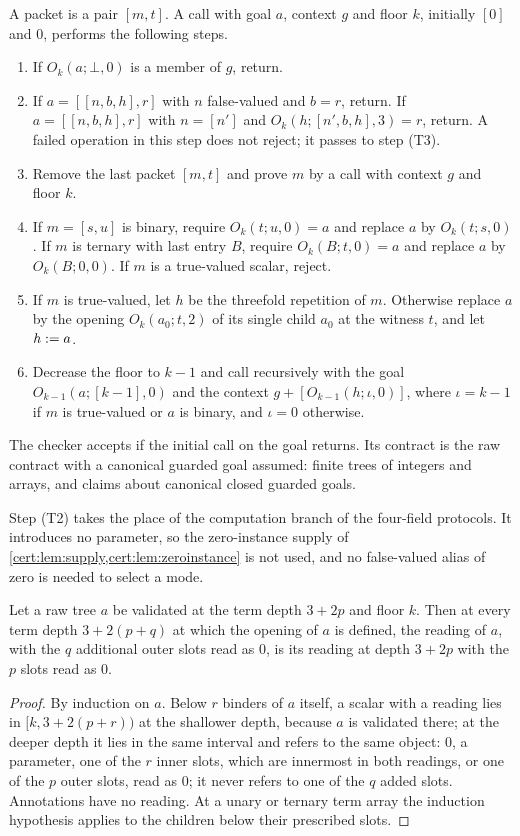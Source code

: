 \begin{definition}\label{cert:def:two-field}
A packet is a pair $[m,t]$. A call with goal $a$, context $g$ and floor $k$,
initially $[0]$ and $0$, performs the following steps.
\begin{enumerate}[label=(T\arabic*)]
\item If $O_k(a;\bot,0)$ is a member of $g$, return.
\item If $a=[[n,b,h],r]$ with $n$ false-valued and $b=r$, return. If
$a=[[n,b,h],r]$ with $n=[n']$ and $O_k(h;[n',b,h],3)=r$, return. A failed
operation in this step does not reject; it passes to step (T3).
\item Remove the last packet $[m,t]$ and prove $m$ by a call with context $g$
and floor $k$.
\item If $m=[s,u]$ is binary, require $O_k(t;u,0)=a$ and replace $a$ by
$O_k(t;s,0)$. If $m$ is ternary with last entry $B$, require $O_k(B;t,0)=a$
and replace $a$ by $O_k(B;0,0)$. If $m$ is a true-valued scalar, reject.
\item If $m$ is true-valued, let $h$ be the threefold repetition of $m$.
Otherwise replace $a$ by the opening $O_k(a_0;t,2)$ of its single child $a_0$
at the witness $t$, and let $h\mathrel{:=} a$.
\item Decrease the floor to $k-1$ and call recursively with the goal
$O_{k-1}(a;[k-1],0)$ and the context $g+[O_{k-1}(h;\iota,0)]$, where
$\iota=k-1$ if $m$ is true-valued or $a$ is binary, and $\iota=0$ otherwise.
\end{enumerate}
The checker accepts if the initial call on the goal returns. Its contract is
the raw contract with a canonical guarded goal assumed: finite trees of
integers and arrays, and claims about canonical closed guarded goals.
\end{definition}

Step (T2) takes the place of the computation branch of the four-field
protocols. It introduces no parameter, so the zero-instance supply of
\cref{cert:lem:supply,cert:lem:zeroinstance} is not used, and no false-valued
alias of zero is needed to select a mode.

\begin{lemma}\label{cert:lem:dummy-erasure}
Let a raw tree $a$ be validated at the term depth $3+2p$ and floor $k$. Then
at every term depth $3+2(p+q)$ at which the opening of $a$ is defined, the
reading of $a$, with the $q$ additional outer slots read as $0$, is its
reading at depth $3+2p$ with the $p$ slots read as $0$.
\end{lemma}
\begin{proof}
By induction on $a$. Below $r$ binders of $a$ itself, a scalar with a
reading lies in $[k,3+2(p+r))$ at the shallower depth, because $a$ is
validated there; at the deeper depth it lies in the same interval and refers
to the same object: $0$, a parameter, one of the $r$ inner slots, which are
innermost in both readings, or one of the $p$ outer slots, read as $0$; it
never refers to one of the $q$ added slots. Annotations have no reading. At a
unary or ternary term array the induction hypothesis applies to the children
below their prescribed slots.
\end{proof}

